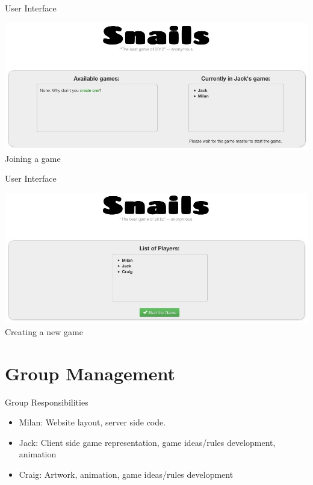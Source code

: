 \documentclass{beamer}
\begin{document}
\begin{frame}{User Interface}
  \begin{center}
    \includegraphics[scale=0.35]{join.jpg} \\
    Joining a game
  \end{center}
\end{frame}

\begin{frame}{User Interface}
  \begin{center}
    \includegraphics[scale=0.35]{create.jpg} \\
    Creating a new game
  \end{center}
\end{frame}


\section{Group Management}

\begin{frame}{Group Responsibilities}
  \begin{itemize}
    \item Milan: Website layout, server side code.
    \item Jack: Client side game representation, game ideas/rules development, animation
    \item Craig: Artwork, animation, game ideas/rules development
  \end{itemize}
\end{frame}
\end{document}
